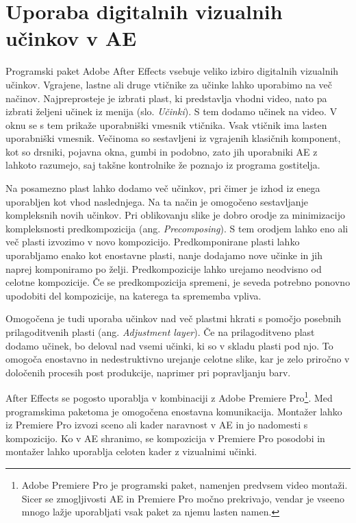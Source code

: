 \documentclass[a4paper, 12pt]{book}
\begin{document}
\section{Uporaba digitalnih vizualnih učinkov v AE}

Programski paket Adobe After Effects vsebuje veliko izbiro digitalnih vizualnih učinkov.
Vgrajene, lastne ali druge vtičnike za učinke lahko uporabimo na več načinov.
Najpreprosteje je izbrati plast, ki predstavlja vhodni video, nato pa izbrati željeni učinek iz menija  (slo. {\it Učinki}).
S tem dodamo učinek na video.
V oknu  se s tem prikaže uporabniški vmesnik vtičnika.
Vsak vtičnik ima lasten uporabniški vmesnik.
Večinoma so sestavljeni iz vgrajenih klasičnih komponent, kot so drsniki, pojavna okna, gumbi in podobno,
zato jih uporabniki AE z lahkoto razumejo, saj takšne kontrolnike že poznajo iz programa gostitelja.

Na posamezno plast lahko dodamo več učinkov, pri čimer je izhod iz enega uporabljen kot vhod naslednjega.
Na ta način je omogočeno sestavljanje kompleksnih novih učinkov.
Pri oblikovanju slike je dobro orodje za minimizacijo kompleksnosti predkompozicija (ang. {\it Precomposing}).
S tem orodjem lahko eno ali več plasti izvozimo v novo kompozicijo.
Predkomponirane plasti lahko uporabljamo enako kot enostavne plasti, nanje dodajamo nove učinke in jih naprej komponiramo po želji.
Predkompozicije lahko urejamo neodvisno od celotne kompozicije.
Če se predkompozicija spremeni, je seveda potrebno ponovno upodobiti del kompozicije, na katerega ta sprememba vpliva.

Omogočena je tudi uporaba učinkov nad več plastmi hkrati s pomočjo posebnih prilagoditvenih plasti (ang. {\it Adjustment layer}).
Če na prilagoditveno plast dodamo učinek, bo deloval nad vsemi učinki, ki so v skladu plasti pod njo.
To omogoča enostavno in nedestruktivno urejanje celotne slike, kar je zelo priročno v določenih procesih post produkcije, naprimer pri popravljanju barv.

After Effects se pogosto uporablja v kombinaciji z Adobe Premiere Pro\footnote{Adobe Premiere Pro je programski paket, namenjen predvsem video montaži. 
Sicer se zmogljivosti AE in Premiere Pro močno prekrivajo, vendar je vseeno mnogo lažje uporabljati vsak paket za njemu lasten namen.}.
Med programskima paketoma je omogočena enostavna komunikacija.
Montažer lahko iz Premiere Pro izvozi sceno ali kader naravnost v AE in jo nadomesti s kompozicijo. 
Ko v AE shranimo, se kompozicija v Premiere Pro posodobi in montažer lahko uporablja celoten kader z vizualnimi učinki.
\end{document}
